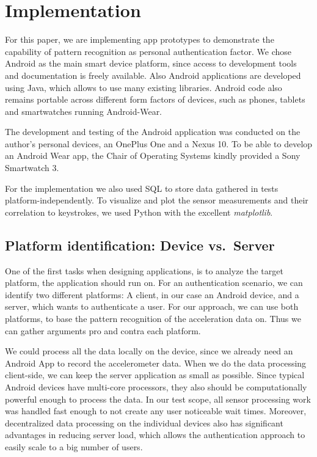 \chapter{Implementation}\label{chapter:implementation}
For this paper, we are implementing app prototypes to demonstrate the capability of pattern recognition as personal authentication factor. We chose Android as the main smart device platform, since access to development tools and documentation is freely available. Also Android applications are developed using Java, which allows to use many existing libraries. Android code also remains portable across different form factors of devices, such as phones, tablets and smartwatches running Android-Wear.

The development and testing of the Android application was conducted on the author's personal devices, an OnePlus One and a Nexus 10. To be able to develop an Android Wear app, the Chair of Operating Systems kindly provided a Sony Smartwatch 3.

For the implementation we also used SQL to store data gathered in tests platform-independently. To visualize and plot the sensor measurements and their correlation to keystrokes, we used Python with the excellent \emph{matplotlib}.

\section{Platform identification: Device vs.\ Server}
One of the first tasks when designing applications, is to analyze the target platform, the application should run on. For an authentication scenario, we can identify two different platforms: A client, in our case an Android device, and a server, which wants to authenticate a user. For our approach, we can use both platforms, to base the pattern recognition of the acceleration data on. Thus we can gather arguments pro and contra each platform.

We could process all the data locally on the device, since we already need an Android App to record the accelerometer data. When we do the data processing client-side, we can keep the server application as small as possible. Since typical Android devices have multi-core processors, they also should be computationally powerful enough to process the data. In our test scope, all sensor processing work was handled fast enough to not create any user noticeable wait times. Moreover, decentralized data processing on the individual devices also has significant advantages in reducing server load, which allows the authentication approach to easily scale to a big number of users.

